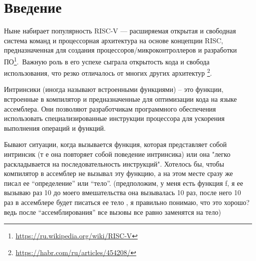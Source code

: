 
\section*{Введение}
\thispagestyle{withCompileDate}
Ныне набирает популярность RISC-V --- расширяемая открытая и свободная
 система команд и
 процессорная архитектура на основе концепции RISC,
  предназначенная для создания процессоров/микроконтроллеров
   и разработки ПО\footnote{\url{https://ru.wikipedia.org/wiki/RISC-V}}.\
   Важную роль в его успехе сыграла открытость кода и свобода использования, что резко отличалось
    от многих других архитектур \footnote[2]{\url{https://habr.com/ru/articles/454208/}}.

	Интринсики (иногда называют встроенными функциями) – это функции,
	 встроенные в компилятор и предназначенные для оптимизации кода на языке ассемблера.
	  Они позволяют разработчикам программного обеспечения использовать специализированные
	   инструкции процессора для ускорения выполнения операций и функций.

Бывают ситуации, когда вызывается функция, которая представляет собой интринсик (т е она повторяет собой поведение интринсика) или
она "легко раскладывается на последовательность инструкций".
Хотелось бы, чтобы компилятор в ассемблер не вызывал эту функцию, а на этом месте сразу же
писал ее ``определение'' или ``тело''. (предположим, у меня есть функция f, я ее вызываю раз 10
до моего вмешательства она вызывалась 10 раз, после него 10 раз в ассемблере будет писаться ее тело
, я правильно понимаю, что это хорошо? ведь после ``ассемблирования'' все вызовы все равно заменятся на тело)






